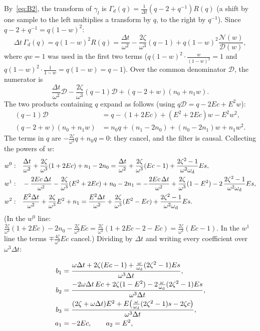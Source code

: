 By~\eqref{eq:B2}, the transform of $\gamma_l$ is $\Gamma_d(q) = \frac{1}{\Delta t}(q-2+q^{-1})R(q)$
(a shift by one sample to the left multiplies a transform by $q$, to the right by $q^{-1}$). Since
$q-2+q^{-1} = q(1-w)^2$:
\begin{equation}
  \Delta t\,\Gamma_d(q) = q(1-w)^2R(q) = \frac{\Delta t}{\omega^2} - \frac{2\zeta}{\omega^3}(q-1) + q(1-w)^2\frac{\mathcal N(w)}{\mathcal D(w)},
\end{equation}
where $qw = 1$ was used in the first two terms ($q(1-w)^2\cdot\frac{w}{(1-w)^2} = 1$ and
$q(1-w)^2\cdot\frac{1}{1-w} = q(1-w) = q-1$). Over the common denominator $\mathcal D$, the numerator is
\begin{equation}
  \frac{\Delta t}{\omega^2}\mathcal D - \frac{2\zeta}{\omega^3}(q-1)\mathcal D + (q-2+w)(n_0+n_1w).
\end{equation}
The two products containing $q$ expand as follows (using $q\mathcal D = q - 2Ec + E^2w$):
\begin{align}
  (q-1)\mathcal D &= q - (1+2Ec) + (E^2+2Ec)w - E^2w^2,\\
  (q-2+w)(n_0+n_1w) &= n_0q + (n_1-2n_0) + (n_0-2n_1)w + n_1w^2 .
\end{align}
The terms in $q$ are $-\frac{2\zeta}{\omega^3}q + n_0q = 0$: they cancel, and the filter is causal.
Collecting the powers of $w$:
\begin{align}
  w^0:&\quad \frac{\Delta t}{\omega^2} + \frac{2\zeta}{\omega^3}(1+2Ec) + n_1 - 2n_0
  = \frac{\Delta t}{\omega^2} + \frac{2\zeta}{\omega^3}(Ec-1) + \frac{2\zeta^2-1}{\omega^2\omega_{\mathrm{d}}}Es,\\
  w^1:&\quad -\frac{2Ec\,\Delta t}{\omega^2} - \frac{2\zeta}{\omega^3}(E^2+2Ec) + n_0 - 2n_1
  = -\frac{2Ec\,\Delta t}{\omega^2} + \frac{2\zeta}{\omega^3}(1-E^2) - 2\,\frac{2\zeta^2-1}{\omega^2\omega_{\mathrm{d}}}Es,\\
  w^2:&\quad \frac{E^2\Delta t}{\omega^2} + \frac{2\zeta}{\omega^3}E^2 + n_1
  = \frac{E^2\Delta t}{\omega^2} + \frac{2\zeta}{\omega^3}(E^2 - Ec) + \frac{2\zeta^2-1}{\omega^2\omega_{\mathrm{d}}}Es .
\end{align}
(In the $w^0$ line: $\frac{2\zeta}{\omega^3}(1+2Ec) - 2n_0 - \frac{2\zeta}{\omega^3}Ec =
\frac{2\zeta}{\omega^3}(1+2Ec-2-Ec) = \frac{2\zeta}{\omega^3}(Ec-1)$. In the $w^1$ line the terms
$\mp\frac{4\zeta}{\omega^3}Ec$ cancel.) Dividing by $\Delta t$ and writing every coefficient over
$\omega^3\Delta t$:
\begin{result}
\begin{align}
  b_1 &= \frac{\omega\Delta t + 2\zeta(Ec-1) + \frac{\omega}{\omega_{\mathrm{d}}}(2\zeta^2-1)Es}{\omega^3\Delta t},\\
  b_2 &= \frac{-2\omega\Delta t\,Ec + 2\zeta(1-E^2) - 2\frac{\omega}{\omega_{\mathrm{d}}}(2\zeta^2-1)Es}{\omega^3\Delta t},\\
  b_3 &= \frac{(2\zeta+\omega\Delta t)E^2 + E\bigl(\frac{\omega}{\omega_{\mathrm{d}}}(2\zeta^2-1)s - 2\zeta c\bigr)}{\omega^3\Delta t},\\
  a_1 &= -2Ec,\qquad a_2 = E^2,
\end{align}
\end{result}
